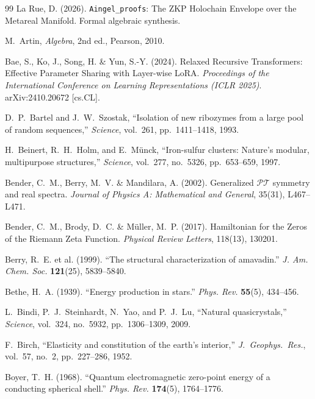\documentclass[12pt,oneside]{book}
\theoremstyle{principia}
\theoremstyle{definition}
\theoremstyle{remark}
\begin{document}
\vspace{2em}
\begin{thebibliography}{99}
La Rue, D. (2026).
\texttt{Aingel\_proofs}: The ZKP Holochain Envelope over the Metareal Manifold.
Formal algebraic synthesis.

M.~Artin,
\emph{Algebra},
2nd ed., Pearson, 2010.

Bae, S., Ko, J., Song, H. \& Yun, S.-Y. (2024).
Relaxed Recursive Transformers: Effective Parameter Sharing with Layer-wise LoRA.
\textit{Proceedings of the International Conference on Learning Representations (ICLR 2025)}.
arXiv:2410.20672 [cs.CL].

D.~P.~Bartel and J.~W.~Szostak,
``Isolation of new ribozymes from a large pool of random sequences,''
\emph{Science}, vol.~261, pp.~1411--1418, 1993.

H.~Beinert, R.~H.~Holm, and E.~M\"unck,
``Iron-sulfur clusters: Nature's modular, multipurpose structures,''
\emph{Science}, vol.~277, no.~5326, pp.~653--659, 1997.

Bender, C.~M., Berry, M.~V. \& Mandilara, A. (2002).
Generalized $\mathcal{PT}$ symmetry and real spectra.
\textit{Journal of Physics A: Mathematical and General}, 35(31), L467--L471.

Bender, C.~M., Brody, D.~C. \& M\"uller, M.~P. (2017).
Hamiltonian for the Zeros of the Riemann Zeta Function.
\textit{Physical Review Letters}, 118(13), 130201.

Berry, R.~E. et al. (1999).
``The structural characterization of amavadin.''
\textit{J. Am. Chem. Soc.} \textbf{121}(25), 5839--5840.

Bethe, H.~A. (1939).
``Energy production in stars.''
\textit{Phys. Rev.} \textbf{55}(5), 434--456.

L.~Bindi, P.~J.~Steinhardt, N.~Yao, and P.~J.~Lu,
``Natural quasicrystals,''
\emph{Science}, vol.~324, no.~5932, pp.~1306--1309, 2009.

F.~Birch,
``Elasticity and constitution of the earth's interior,''
\emph{J.\ Geophys.\ Res.}, vol.~57, no.~2, pp.~227--286, 1952.

Boyer, T.~H. (1968).
``Quantum electromagnetic zero-point energy of a conducting spherical shell.''
\textit{Phys. Rev.} \textbf{174}(5), 1764--1776.


\end{thebibliography}
\end{document}
